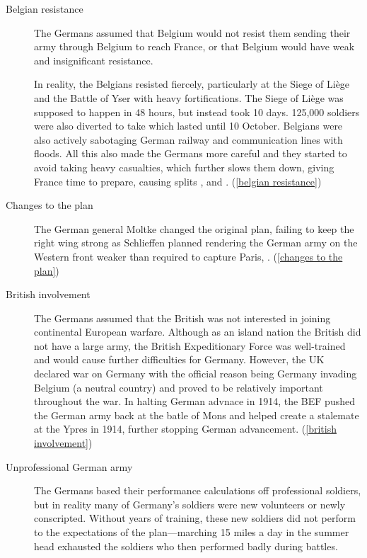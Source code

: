 \documentclass[a4paper,numbers=endperiod,most,twoside,english,final,openany]{scrbook} %
\providecommand\vref[1]{\ref{#1}}
\begin{document}
\begin{description}
	\item [{Belgian resistance}] The Germans assumed that Belgium would not resist them sending their army through Belgium to reach France, or that Belgium would have weak and insignificant resistance.

		In reality, the Belgians resisted fiercely, particularly at the Siege of Liège and the Battle of Yser with heavy fortifications. The Siege of Liège was supposed to happen in 48 hours, but instead took 10 days. 125,000 soldiers were also diverted to take  which lasted until 10 October. Belgians were also actively sabotaging German railway and communication lines with floods. All this also made the Germans more careful and they started to avoid taking heavy casualties, which further slows them down, giving France time to prepare, causing splits , and . (\vref{belgian resistance})
	\item [{Changes to the plan}] The German general Moltke changed the original plan, failing to keep the right wing strong as Schlieffen planned rendering the German army on the Western front weaker than required to capture Paris, . (\vref{changes to the plan})
	\item [{British involvement}] The Germans assumed that the British was not interested in joining continental European warfare. Although as an island nation the British did not have a large army, the British Expeditionary Force was well-trained and would cause further difficulties for Germany. However, the UK declared war on Germany with the official reason being Germany invading Belgium (a neutral country) and proved to be relatively important throughout the war. In halting German advnace in 1914, the BEF pushed the German army back at the batle of Mons and helped create a stalemate at the Ypres in 1914, further stopping German advancement. (\vref{british involvement})
	\item [{Unprofessional German army}] The Germans based their performance calculations off professional soldiers, but in reality many of Germany's soldiers were new volunteers or newly conscripted. Without years of training, these new soldiers did not perform to the expectations of the plan---marching 15 miles a day in the summer head exhausted the soldiers who then performed badly during battles.

\end{description}
\end{document}
